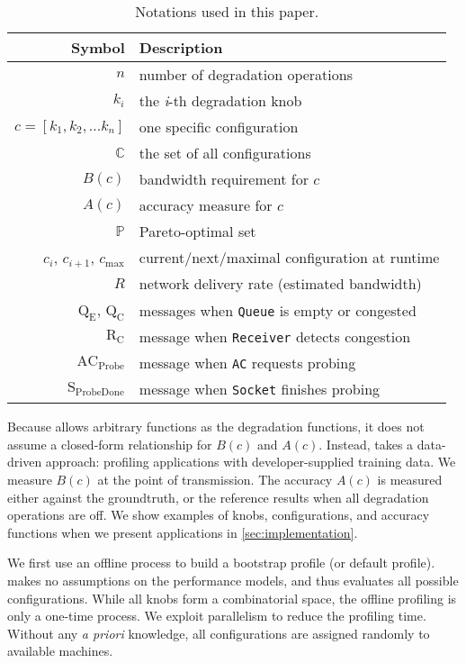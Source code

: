 \begin{table}
  \footnotesize
  \centering
  \begin{tabular}{r l}
    \toprule
    \textbf{Symbol} & \textbf{Description} \\
    \midrule
    $n$ & number of degradation operations \\
    $k_i$ & the \textit{i}-th degradation knob \\
    $c = [k_{1}, k_{2}, ... k_{n}]$ & one specific configuration \\
    $\mathbb{C}$ & the set of all configurations \\
    \midrule
    $B(c)$ & bandwidth requirement for $c$ \\
    $A(c)$ & accuracy measure for $c$ \\
    $\mathbb{P}$ & Pareto-optimal set \\
    \midrule
    $c_i$, $c_{i+1}$, $c_{\max}$ & current/next/maximal configuration at runtime \\
    $R$ & network delivery rate (estimated bandwidth) \\
    $\text{Q}_\text{E}$, $\text{Q}_\text{C}$ & messages when \texttt{Queue} is empty or congested \\
    $\text{R}_\text{C}$ & message when \texttt{Receiver} detects congestion \\
    $\text{AC}_\text{Probe}$ & message when \texttt{AC} requests probing \\
    $\text{S}_\text{ProbeDone}$ & message when \texttt{Socket} finishes probing \\
    \bottomrule
  \end{tabular}
  \vspace{0.3em}
  \caption{Notations used in this paper.}
  \label{tab:notations}
  \vspace{-3em}
\end{table}

Because \sysname{} allows arbitrary functions as the degradation functions, it
does not assume a closed-form relationship for $B(c)$ and $A(c)$. Instead,
\sysname{} takes a data-driven approach: profiling applications with
developer-supplied training data.  We measure $B(c)$ at the point of
transmission. The accuracy $A(c)$ is measured either against the groundtruth, or
the reference results when all degradation operations are off.  We show examples
of knobs, configurations, and accuracy functions when we present applications in
\autoref{sec:implementation}.

 We first use an offline process to build a bootstrap
profile (or default profile).  \sysname{} makes no assumptions on the
performance models, and thus evaluates all possible configurations.  While all
knobs form a combinatorial space, the offline profiling is only a one-time
process.  We exploit parallelism to reduce the profiling time.  Without any
\textit{a priori} knowledge, all configurations are assigned randomly to
available machines.

